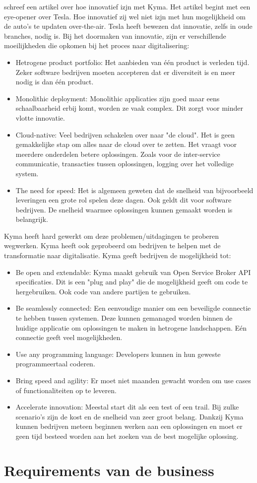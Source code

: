 \textcite{Kannappan2018} schreef een artikel over hoe innovatief izjn met Kyma. Het artikel begint met een eye-opener over Tesla. Hoe innovatief zij wel niet izjn met hun mogelijkheid om de auto's te updaten over-the-air. Tesla heeft bewezen dat innovatie, zelfs in oude branches, nodig is. 
Bij het doormaken van innovatie, zijn er verschillende moeilijkheden die opkomen bij het proces naar digitalisering:
\begin{itemize}
	\item Hetrogene product portfolio: Het aanbieden van één product is verleden tijd. Zeker software bedrijven moeten accepteren dat er diversiteit is en meer nodig is dan één product.
	\item Monolithic deployment: Monolithic applicaties zijn goed maar eens schaalbaarheid erbij komt, worden ze vaak complex. Dit zorgt voor minder vlotte innovatie. 
	\item Cloud-native: Veel bedrijven schakelen over naar "de cloud". Het is geen gemakkelijke stap om alles naar de cloud over te zetten. Het vraagt voor meerdere onderdelen betere oplossingen. Zoals voor de inter-service communicatie, transacties tussen oplossingen, logging over het volledige system.
	\item The need for speed: Het is algemeen geweten dat de snelheid van bijvoorbeeld leveringen een grote rol spelen deze dagen. Ook geldt dit voor software bedrijven. De snelheid waarmee oplossingen kunnen gemaakt worden is belangrijk.
\end{itemize}
Kyma heeft hard gewerkt om deze problemen/uitdagingen te proberen wegwerken. Kyma heeft ook geprobeerd om bedrijven te helpen met de transformatie naar digitalisatie. Kyma geeft bedrijven de mogelijkheid tot:
\begin{itemize}
	\item Be open and extendable: Kyma maakt gebruik van Open Service Broker API specificaties. Dit is een "plug and play" die de mogelijkheid geeft om code te hergebruiken. Ook code van andere partijen te gebruiken. 
	\item Be seamlessly connected: Een eenvoudige manier om een beveiligde connectie te hebben tussen systemen. Deze kunnen gemanaged worden binnen de huidige applicatie om oplossingen te maken in hetrogene landschappen. Eén connectie geeft veel mogelijkheden.
	\item Use any programming language: Developers kunnen in hun geweste programmeertaal coderen.
	\item Bring speed and agility: Er moet niet maanden gewacht worden om use cases of functionaliteiten op te leveren. 
	\item Accelerate innovation: Meestal start dit als een test of een trail. Bij zulke scenario's zijn de kost en de snelheid van zeer groot belang. Dankzij Kyma kunnen bedrijven meteen beginnen werken aan een oplossingen en moet er geen tijd besteed worden aan het zoeken van de best mogelijke oplossing. 
\end{itemize}


\section{Requirements van de business}

